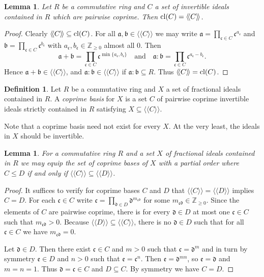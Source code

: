 \documentclass{amsart}
\theoremstyle{plain}
\newtheorem{lemma}[theorem]{Lemma}
\theoremstyle{definition}
\newtheorem{definition}[theorem]{Definition}
\newcommand{\lla}{\langle\!\langle}
\newcommand{\rra}{\rangle\!\rangle}
\newcommand{\Z}{\ensuremath{\mathbb{Z}}}
\begin{document}
\begin{lemma}\label{lem:closure_is_monoid}
Let \(R\) be a commutative ring and \(C\) a set of invertible ideals contained in \(R\) which are pairwise coprime. Then \(\textup{cl}(C)=\lla C\rra\).
\end{lemma}
\begin{proof}
Clearly \(\lla C\rra \subseteq \textup{cl}(C)\).
For all \(\mathfrak{a},\mathfrak{b}\in\lla C\rra\) we may write \(\mathfrak{a}=\prod_{\mathfrak{c}\in C} \mathfrak{c}^{a_\mathfrak{c}}\) and \(\mathfrak{b}=\prod_{\mathfrak{c}\in C}\mathfrak{c}^{b_\mathfrak{c}}\) with \(a_\mathfrak{c},b_\mathfrak{c}\in\Z_{\geq0}\) almost all \(0\). 
Then
\[
\mathfrak{a}+\mathfrak{b} = \prod_{\mathfrak{c}\in C} \mathfrak{c}^{\min\{a_\mathfrak{c},b_\mathfrak{c}\}}
\quad\text{and}\quad 
\mathfrak{a}:\mathfrak{b} = \prod_{\mathfrak{c}\in C} \mathfrak{c}^{a_\mathfrak{c}-b_\mathfrak{c}}. \]
Hence \(\mathfrak{a}+\mathfrak{b}\in \lla C\rra\), and \(\mathfrak{a}:\mathfrak{b}\in \lla C\rra\) if \(\mathfrak{a}:\mathfrak{b}\subseteq R\). 
Thus \(\lla C\rra = \textup{cl}(C)\).
\end{proof}

\begin{definition}
Let \(R\) be a commutative ring and \(X\) a set of fractional ideals contained in \(R\).
A {\em coprime basis} for \(X\) is a set \(C\) of pairwise coprime invertible ideals strictly contained in \(R\) satisfying \( X\subseteq\lla C\rra\).
\end{definition}

Note that a coprime basis need not exist for every \(X\). At the very least, the ideals in \(X\) should be invertible.

\begin{lemma}\label{lem:coprime_basis_partial_order}
For a commutative ring \(R\) and a set \(X\) of fractional ideals contained in \(R\) we may equip the set of coprime bases of \(X\) with a partial order where \(C\leq D\) if and only if \(\lla C\rra\subseteq\lla D\rra\).
\end{lemma}
\begin{proof}
It suffices to verify for coprime bases \(C\) and \(D\) that \(\lla C\rra = \lla D\rra\) implies \(C=D\).
For each $\mathfrak{c}\in C$ write \(\mathfrak{c}=\prod_{\mathfrak{d}\in D} \mathfrak{d}^{m_{\mathfrak{cd}}}\) for some \(m_{\mathfrak{c}\mathfrak{d}}\in\Z_{\geq 0}\).
Since the elements of \(C\) are pairwise coprime, there is for every \(\mathfrak{d}\in D\) at most one \(\mathfrak{c}\in C\) such that \(m_{\mathfrak{cd}}>0\).
Because \(\lla D\rra\subseteq \lla C\rra\), there is no \(\mathfrak{d}\in D\) such that for all \(\mathfrak{c}\in C\) we have \(m_{\mathfrak{cd}}=0\). 

Let \(\mathfrak{d}\in D\). Then there exist \(\mathfrak{c}\in C\) and \(m>0\) such that \(\mathfrak{c}=\mathfrak{d}^m\) and in turn by symmetry \(\mathfrak{e}\in D\) and \(n>0\) such that \(\mathfrak{e}=\mathfrak{c}^n\). Then \(\mathfrak{e}=\mathfrak{d}^{mn}\), so \(\mathfrak{e}=\mathfrak{d}\) and \(m=n=1\). Thus \(\mathfrak{d}=\mathfrak{c}\in C\) and \(D\subseteq C\). By symmetry we have \(C=D\).
\end{proof}
\end{document}
